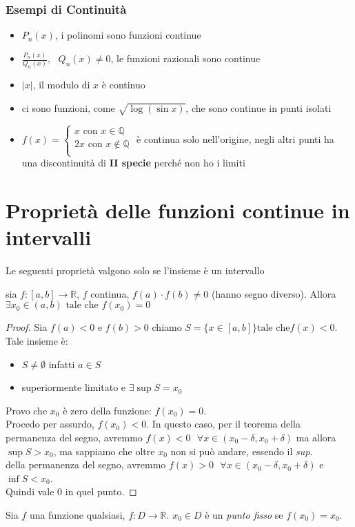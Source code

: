 \documentclass[a4paper,12pt, oneside]{book}
\begin{document}
\subsubsection{Esempi di Continuità}
\begin{itemize}
  \item $P_n(x)$, i polinomi sono funzioni continue
  \item $\frac{P_n(x)}{Q_n(x)}, \mbox{ } Q_n(x)\neq 0$, le funzioni razionali
  sono continue
  \item $|x|$, il modulo di $x$ è continuo
  \item ci sono funzioni, come $\sqrt{\log(\sin x)}$, che sono continue in punti
  isolati
  \item $f(x)=\left\{
    \begin{array}{ll} x \mbox{ con } x\in\mathbb{Q} \\ 2x \mbox{ con }
      x\not\in\mathbb{Q} \\
    \end{array} \right.$ è continua solo nell'origine, negli altri punti ha una
  discontinuità di \textbf{II specie} perché non ho i limiti
\end{itemize}
\newpage
\section{Proprietà delle funzioni continue in intervalli} Le seguenti proprietà
valgono solo se l'insieme è un intervallo
\begin{teorema} sia $f:[a,b]\rightarrow \mathbb{R}$, $f$ continua,
  $f(a)\cdot f(b)\neq 0$ (hanno segno diverso). Allora $\exists x_0\in (a,b)
  \mbox{ tale che } f(x_0)=0$
\end{teorema}
\begin{proof} Sia $f(a)<0$ e $f(b)>0$ chiamo $S=\{x\in [a,b]\} \mbox{tale che}
  f(x)<0$. Tale insieme è:
  \begin{itemize}
    \item $S \neq \emptyset$ infatti $a\in S$
    \item superiormente limitato e $\exists \sup S= x_0$
  \end{itemize} Provo che $x_0$ è zero della funzione: $f(x_0)=0$.\\ Procedo per
  assurdo, $f(x_0)<0$. In questo caso, per il teorema della permanenza del segno,
  avremmo $f(x)<0 \mbox{ } \forall x \in (x_0-\delta, x_0+\delta)$ ma allora $\sup
  S>x_0$, ma sappiamo che oltre $x_0$ non si può andare, essendo il
  \textit{sup}.\\ %
  della permanenza del segno, avremmo $f(x)>0 \mbox{ } \forall x \in (x_0-\delta,
  x_0+\delta)$ e $\inf S<x_0$.\\ Quindi vale $0$ in quel punto.
\end{proof}
\begin{shaded} Sia $f$ una funzione qualsiasi, $f:D\rightarrow
  \mathbb{R}$. $x_0\in D$ è un \textit{punto fisso} se $f(x_0)=x_0$.
\end{shaded}
\end{document}
